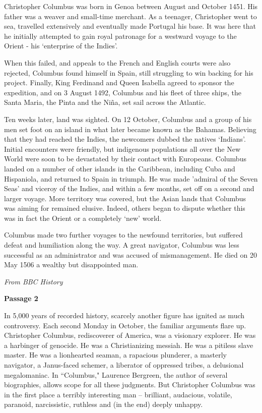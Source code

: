 \documentclass[12pt]{book}
\renewcommand{\indent}{\hspace{1cm}}
\begin{document}
\bigskip
\begin{linenumbers*}
\modulolinenumbers[5]
\indent Christopher Columbus was born in Genoa between August and October 1451. His father was a weaver and small-time merchant. As a teenager, Christopher went to sea, travelled extensively and eventually made Portugal his base. It was here that he initially attempted to gain royal patronage for a westward voyage to the Orient - his `enterprise of the Indies'.

\indent When this failed, and appeals to the French and English courts were also rejected, Columbus found himself in Spain, still struggling to win backing for his project. Finally, King Ferdinand and Queen Isabella agreed to sponsor the expedition, and on 3 August 1492, Columbus and his fleet of three ships, the Santa Maria, the Pinta and the Niña, set sail across the Atlantic.

\indent Ten weeks later, land was sighted. On 12 October, Columbus and a group of his men set foot on an island in what later became known as the Bahamas. Believing that they had reached the Indies, the newcomers dubbed the natives `Indians'. Initial encounters were friendly, but indigenous populations all over the New World were soon to be devastated by their contact with Europeans. Columbus landed on a number of other islands in the Caribbean, including Cuba and Hispaniola, and returned to Spain in triumph. He was made 'admiral of the Seven Seas' and viceroy of the Indies, and within a few months, set off on a second and larger voyage. More territory was covered, but the Asian lands that Columbus was aiming for remained elusive. Indeed, others began to dispute whether this was in fact the Orient or a completely `new' world.

\indent Columbus made two further voyages to the newfound territories, but suffered defeat and humiliation along the way. A great navigator, Columbus was less successful as an administrator and was accused of mismanagement. He died on 20 May 1506 a wealthy but disappointed man.
\end{linenumbers*}

\textit{From BBC History}

\bigskip
\textbf{Passage 2}

\bigskip
\begin{linenumbers}
\modulolinenumbers[5]
\indent In 5,000 years of recorded history, scarcely another figure has ignited as much controversy. Each second Monday in October, the familiar arguments flare up. Christopher Columbus, rediscoverer of America, was a visionary explorer. He was a harbinger of genocide. He was a Christianizing messiah. He was a pitiless slave master. He was a lionhearted seaman, a rapacious plunderer, a masterly navigator, a Janus-faced schemer, a liberator of oppressed tribes, a delusional megalomaniac. In ``Columbus," Laurence Bergreen, the author of several biographies, allows scope for all these judgments. But Christopher Columbus was in the first place a terribly interesting man -- brilliant, audacious, volatile, paranoid, narcissistic, ruthless and (in the end) deeply unhappy.
\end{linenumbers}
\end{document}
